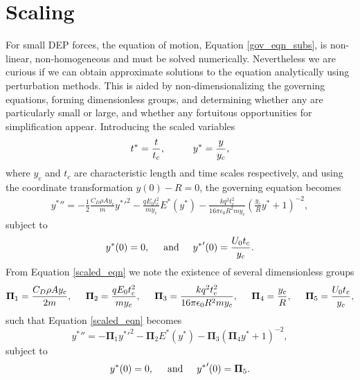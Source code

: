 \documentclass[12pt,a4paper,oneside]{book}
\begin{document}
\section{Scaling}
For small DEP forces, the equation of motion, Equation \ref{gov_eqn_subs}, is non-linear, non-homogeneous and must be solved numerically. Nevertheless we are curious if we can obtain approximate solutions to the equation analytically using perturbation methods. This is aided by non-dimensionalizing the governing equations, forming dimensionless groups, and determining whether any are particularly small or large, and whether any fortuitous opportunities for simplification appear. Introducing the scaled variables
\begin{equation}
 t^* = \frac{t}{t_c}, \hspace{10 mm} y^* = \frac{y}{y_c}, \end{equation}
where $y_c$ and $t_c$ are characteristic length and time scales respectively, and using the coordinate transformation $y(0) - R = 0$, the governing equation becomes
\begin{eqnarray}
& {y^*}'' = - \frac{1}{2} \frac{C_D \rho A y_c}{m} {y^*}'^2
- \frac{q E_0 t_c^2}{m y_c} E^* ( {y^*} ) 
- \frac{k q^2 t_c^2}{16 \pi \epsilon_0 R^2 m y_c} \left( \frac{y_c}{R} {y^*} + 1 \right)^{-2}, & \label{scaled_eqn}
\end{eqnarray}
subject to 
\begin{equation*}
{y^*}(0) = 0, \hspace{5 mm} \mbox{and} \hspace{5 mm} {y^*}'(0) = \frac{U_0 t_c}{y_c} .
\end{equation*}
From Equation \ref{scaled_eqn} we note the existence of several dimensionless groups
\[ \mathbf{\Pi}_1 = \frac{C_D \rho A y_c}{2 m}, \hspace{5 mm}
\mathbf{\Pi}_2 = \frac{q E_0 t_c^2}{m y_c}, \hspace{5 mm}
\mathbf{\Pi}_3 = \frac{k q^2 t_c^2}{16 \pi \epsilon_0 R^2 m y_c}, \hspace{5 mm}
\mathbf{\Pi}_4 = \frac{y_c}{R}, \hspace{5 mm}
\mathbf{\Pi}_5 = \frac{U_0 t_c}{y_c},\]
such that Equation \ref{scaled_eqn} becomes
\begin{equation}
\label{pi_terms}
 {y^*}'' = - \mathbf{\Pi}_1 {y^*}'^2
- \mathbf{\Pi}_2 E^* ( {y^*} ) 
- \mathbf{\Pi}_3 \left( \mathbf{\Pi}_4 {y^*} + 1 \right)^{-2},
\end{equation}
subject to
\begin{equation*}
{y^*}(0) = 0, \hspace{5 mm} \mbox{and} \hspace{5 mm} {y^*}'(0) = \mathbf{\Pi}_5 .
\end{equation*}
\end{document}

